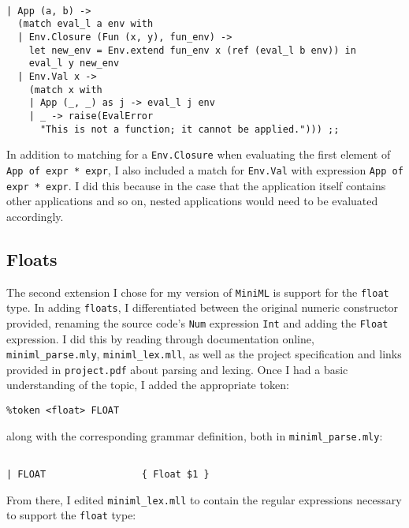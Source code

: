 \documentclass{report}
\begin{document}
\begin{verbatim}

| App (a, b) ->
  (match eval_l a env with
  | Env.Closure (Fun (x, y), fun_env) ->
    let new_env = Env.extend fun_env x (ref (eval_l b env)) in
    eval_l y new_env 
  | Env.Val x -> 
    (match x with
    | App (_, _) as j -> eval_l j env
    | _ -> raise(EvalError 
      "This is not a function; it cannot be applied."))) ;;

\end{verbatim}
\newline \newline
In addition to matching for a \texttt{Env.Closure} when evaluating the first element of \texttt{App of expr * expr}, I also included a match for \texttt{Env.Val} with expression \texttt{App of expr * expr}. I did this because in the case that the application itself contains other applications and so on, nested applications would need to be evaluated accordingly.

\subsection{Floats}
The second extension I chose for my version of \texttt{MiniML} is support for the \texttt{float} type. In adding \texttt{floats}, I differentiated between the original numeric constructor provided, renaming the source code's \texttt{Num} expression \texttt{Int} and adding the \texttt{Float} expression. 
\newline \newline
I did this by reading through documentation online, \citep{lexing} \texttt{miniml_parse.mly}, \texttt{miniml_lex.mll}, as well as the project specification and links provided in \texttt{project.pdf} about parsing and lexing. Once I had a basic understanding of the topic, I added the appropriate token: 

\begin{verbatim}
%token <float> FLOAT
\end{verbatim}
\newline \newline
along with the corresponding grammar definition, both in \texttt{miniml_parse.mly}:

\begin{verbatim}

| FLOAT                 { Float $1 }

\end{verbatim}
\newline \newline
From there, I edited \texttt{miniml_lex.mll} to contain the regular expressions necessary to support the \texttt{float} type: \citep{lexing}
\end{document}
